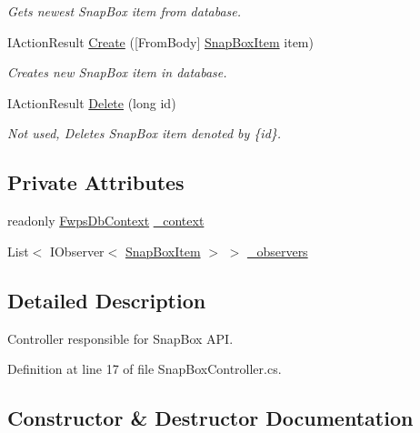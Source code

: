 \begin{DoxyCompactItemize}
\begin{DoxyCompactList}\small\item\em Gets newest Snap\+Box item from database. \end{DoxyCompactList}\item 
I\+Action\+Result \mbox{\hyperlink{class_f_w_p_s_1_1_controllers_1_1_snap_box_controller_a3ea0fbfa5763124116e9ca247affc883}{Create}} (\mbox{[}From\+Body\mbox{]} \mbox{\hyperlink{class_f_w_p_s_1_1_models_1_1_snap_box_item}{Snap\+Box\+Item}} item)
\begin{DoxyCompactList}\small\item\em Creates new Snap\+Box item in database. \end{DoxyCompactList}\item 
I\+Action\+Result \mbox{\hyperlink{class_f_w_p_s_1_1_controllers_1_1_snap_box_controller_aaf17f97e97bf3466ad307469ac8e6247}{Delete}} (long id)
\begin{DoxyCompactList}\small\item\em Not used, Deletes Snap\+Box item denoted by \{id\}. \end{DoxyCompactList}\end{DoxyCompactItemize}
\subsection*{Private Attributes}
\begin{DoxyCompactItemize}
\item 
readonly \mbox{\hyperlink{class_f_w_p_s_1_1_data_1_1_fwps_db_context}{Fwps\+Db\+Context}} \mbox{\hyperlink{class_f_w_p_s_1_1_controllers_1_1_snap_box_controller_aeaf63b1f6165ca718c06f7ff8861cdcb}{\+\_\+context}}
\item 
List$<$ I\+Observer$<$ \mbox{\hyperlink{class_f_w_p_s_1_1_models_1_1_snap_box_item}{Snap\+Box\+Item}} $>$ $>$ \mbox{\hyperlink{class_f_w_p_s_1_1_controllers_1_1_snap_box_controller_a8b970aa8784b1349cd3276235d7a453c}{\+\_\+observers}}
\end{DoxyCompactItemize}


\subsection{Detailed Description}
Controller responsible for Snap\+Box A\+PI. 

Definition at line 17 of file Snap\+Box\+Controller.\+cs.



\subsection{Constructor \& Destructor Documentation}
\mbox{\label{class_f_w_p_s_1_1_controllers_1_1_snap_box_controller_a0815313202414fe5280b69388c94cbd6}} 
